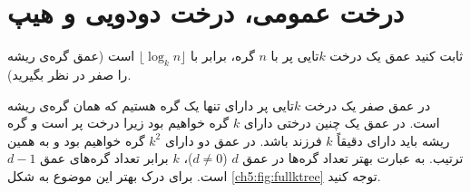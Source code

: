 \chapter{درخت عمومی‌، درخت دودویی و هیپ}
 ثابت کنید عمق  یک درخت  {$k$}تایی پر با {$n$} گره، برابر با {$\lfloor \log_k n \rfloor$} است (عمق گره‌ی ریشه را صفر در نظر بگیرید).


در عمق صفر یک درخت {$k$}تایی پر دارای تنها یک گره هستیم که همان گره‌ی ریشه است. در عمق یک چنین درختی دارای {$k$} گره خواهیم بود زیرا درخت پر است و گره ریشه باید دارای دقیقاً {$k$} فرزند باشد. در عمق دو دارای {$k^2$} گره خواهیم بود و به همین ترتیب. به عبارت بهتر تعداد گره‌ها در عمق {$d$} ({$d \neq 0$})، {$k$} برابر تعداد گره‌های عمق {$d-1$} است. برای درک بهتر این موضوع به شکل {\ref{ch5:fig:fullktree}} توجه کنید.

